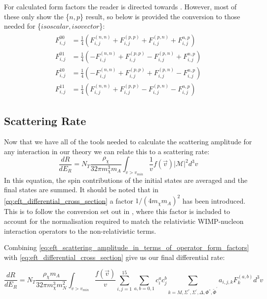 \par
For calculated form factors the reader is directed towards \cite{Fitzpatrick_2013_ref, dmformfactor_ref, nicolelarsen_thesis_ref}.
However, most of these only show the \{$n,p$\} result, so below is provided the conversion to those needed for \{$isoscalar,isovector$\}:
\begin{align}
    \begin{split}
        F_{i,j}^{00}    &= \frac{1}{4} \left( F_{i,j}^{(n,n)} + F_{i,j}^{(p,p)} + F_{i,j}^{(p,n)} + F_{i,j}^{n,p} \right) \\
        F_{i,j}^{01}    &= \frac{1}{4} \left( -F_{i,j}^{(n,n)} + F_{i,j}^{(p,p)} - F_{i,j}^{(p,n)} + F_{i,j}^{n,p} \right) \\
        F_{i,j}^{10}    &= \frac{1}{4} \left( -F_{i,j}^{(n,n)} + F_{i,j}^{(p,p)} + F_{i,j}^{(p,n)} - F_{i,j}^{n,p} \right) \\
        F_{i,j}^{11}    &= \frac{1}{4} \left( F_{i,j}^{(n,n)} + F_{i,j}^{(p,p)} - F_{i,j}^{(p,n)} - F_{i,j}^{n,p} \right)
    \end{split}
\end{align}

\subsection{Scattering Rate}
\par
Now that we have all of the tools needed to calculate the scattering amplitude for any interaction in our theory we can relate this to a scattering rate:
\begin{equation}
    \frac{dR}{dE_R} = N_T \frac{\rho_{\chi}}{32 \pi m_\chi^3 m_A} \int_{v>v_{min}} \frac{1}{v}f(\vec{v}) | \mathcal{M} |^2 d^3 v 
    \label{eq:eft_differential_cross_section}
\end{equation}
In this equation, the spin contributions of the initial states are averaged and the final states are summed.
It should be noted that in \autoref{eq:eft_differential_cross_section} a factor $1/(4m_\chi m_A)^2$ has been introduced.
This is to follow the conversion set out in \cite{dmformfactor_ref}, where this factor is included to account for the normalisation required to match the relativistic WIMP-nucleon interaction operators to the non-relativistic terms.

Combining \autoref{eq:eft_scattering_amplitude_in_terms_of_operator_form_factors} with \autoref{eq:eft_differential_cross_section} give us our final differential rate:

\begin{equation}
    \frac{dR}{dE_R} = N_T \frac{\rho_{\chi} m_A}{32 \pi m_\chi^3 m_N^2} \int_{v>v_{min}} \frac{f(\vec{v})}{v} \sum_{i,j=1}^{15} \sum_{a,b=0,1} c_i^a c_j^b \sum_{k=M,\Sigma^{''},\Sigma^{'},\Delta, \Phi^{''},\tilde{\Phi}^{'}} a_{i,j,k}F_{k}^{(a,b)} d^3 v
    \label{eq:final_eft_differential_cross_section}
\end{equation}

